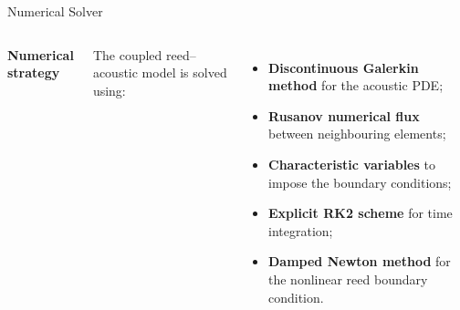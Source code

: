 \documentclass[aspectratio=169,10pt]{beamer}
\begin{document}
\begin{frame}{Numerical Solver}

\begin{columns}[T,onlytextwidth]


\small

\textbf{Numerical strategy}

\vspace{0.25cm}

The coupled reed--acoustic model is solved using:

\vspace{0.15cm}

\begin{itemize}
    \setlength{\itemsep}{0.22cm}

    \item \textbf{Discontinuous Galerkin method}
    for the acoustic PDE;

    \item \textbf{Rusanov numerical flux}
    between neighbouring elements;

    \item \textbf{Characteristic variables}
    to impose the boundary conditions;

    \item \textbf{Explicit RK2 scheme}
    for time integration;

    \item \textbf{Damped Newton method}
    for the nonlinear reed boundary condition.

\end{itemize}


\centering

\vspace{0.15cm}

\begin{tikzpicture}[
    node distance=0.38cm,
    >=Latex,
    box/.style={
        rounded corners=3pt,
        draw=mainblue!70,
        fill=lightblue,
        minimum width=4.7cm,
        minimum height=0.62cm,
        align=center,
        font=\small\bfseries
    }
]


\end{tikzpicture}
\end{columns}
\end{frame}
\end{document}
